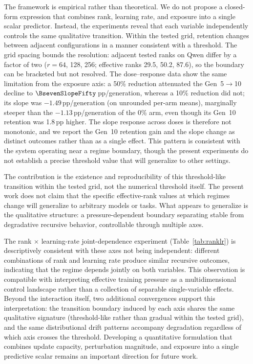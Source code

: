 \documentclass[a4paper,fleqn]{cas-dc}
\newif\ifshowchanges
\newcommand{\rev}[1]{\ifshowchanges{\color{blue}#1}\else{#1}\fi}
\begin{document}
The framework is empirical rather than theoretical. We do not propose a
closed-form expression that combines rank, learning rate, and exposure into a
single scalar predictor. Instead, the experiments reveal that each variable independently
controls the same qualitative transition. \rev{Within the tested grid, retention changes between adjacent configurations in a manner consistent with a threshold. The grid spacing bounds the resolution: adjacent tested ranks on Qwen differ by a factor of two ($r = 64$, 128, 256; effective ranks 29.5, 50.2, 87.6), so the boundary can be bracketed but not resolved. The dose--response data show the same limitation from the exposure axis: a 50\% reduction attenuated the Gen~5$\to$10 decline to $\BsevenSlopeFifty$\,pp/generation, whereas a 10\% reduction did not; its slope was $-1.49$\,pp/generation (on unrounded per-arm means), marginally steeper than the $-1.13$\,pp/generation of the 0\% arm, even though its Gen~10 retention was 1.8\,pp higher. The slope response across doses is therefore not monotonic, and we report the Gen~10 retention gain and the slope change as distinct outcomes rather than as a single effect.
\rev{This pattern is consistent with the system operating near a regime boundary, though the present experiments do not establish a precise threshold value that will generalize to other settings.}}

\rev{The contribution is the existence and reproducibility of this
{threshold-like transition within the tested grid}, not the numerical threshold itself.} The present work does not claim that the
specific effective-rank values at which regimes change will generalize to
arbitrary models or tasks. What appears to generalize is the qualitative
structure: a pressure-dependent boundary separating stable from degradative
recursive behavior, controllable through multiple axes.

The rank $\times$ learning-rate joint-dependence experiment
(Table~\ref{tab:ranklr}) \rev{is descriptively consistent with these axes not being independent}: different combinations of rank and learning rate produce similar
recursive outcomes, indicating that the regime depends jointly on both variables.
\rev{This observation is compatible with interpreting effective training pressure as a multidimensional control landscape} rather than a collection of separable
single-variable effects. Beyond the interaction itself, two additional
convergences support this interpretation:
the transition boundary induced by each axis shares the same qualitative
signature (\rev{threshold-like rather than gradual within the tested grid}), and the same distributional drift patterns
accompany degradation regardless of which axis crosses the threshold. \rev{Developing a quantitative formulation that combines update capacity, perturbation magnitude, and exposure
into a single predictive scalar remains an important direction for future work.}
\end{document}
